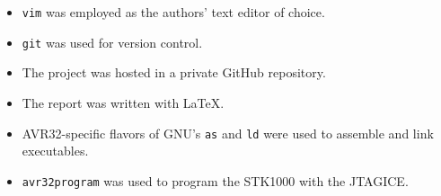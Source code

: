 \begin{itemize}
\item \texttt{vim} was employed as the authors' text editor of choice.
\item \texttt{git} was used for version control.
\item The project was hosted in a private GitHub repository.
\item The report was written with \LaTeX.
\item AVR32-specific flavors of GNU's \texttt{as} and \texttt{ld} were used to assemble and link executables.
\item \texttt{avr32program} was used to program the STK1000 with the JTAGICE.
\end{itemize}
